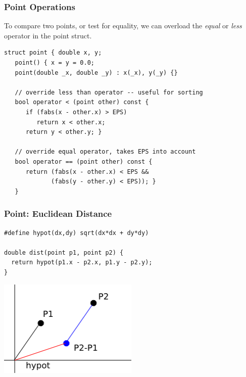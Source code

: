 \documentclass{beamer}
\begin{document}
\begin{frame}
  \frametitle{Point Operations}

  {\smaller
    To compare two points, or test for equality, we can 
    overload the \emph{equal} or \emph{less} operator in the point struct.

    \begin{exampleblock}{}
\begin{verbatim}
struct point { double x, y;
   point() { x = y = 0.0;
   point(double _x, double _y) : x(_x), y(_y) {}

   // override less than operator -- useful for sorting
   bool operator < (point other) const { 
      if (fabs(x - other.x) > EPS)
         return x < other.x;
      return y < other.y; }

   // override equal operator, takes EPS into account
   bool operator == (point other) const {
      return (fabs(x - other.x) < EPS &&  
             (fabs(y - other.y) < EPS)); }
   }
\end{verbatim}
    \end{exampleblock}
  }
\end{frame}

\begin{frame}
  \frametitle{Point: Euclidean Distance}
  {\smaller

    \begin{exampleblock}{}
\begin{verbatim}
#define hypot(dx,dy) sqrt(dx*dx + dy*dy)

double dist(point p1, point p2) {
  return hypot(p1.x - p2.x, p1.y - p2.y);
}
\end{verbatim}
    \end{exampleblock}

    \begin{center}
      \includegraphics[width=0.5\textwidth]{../img/geom1}
    \end{center}
  }
\end{frame}
  
\end{document}
